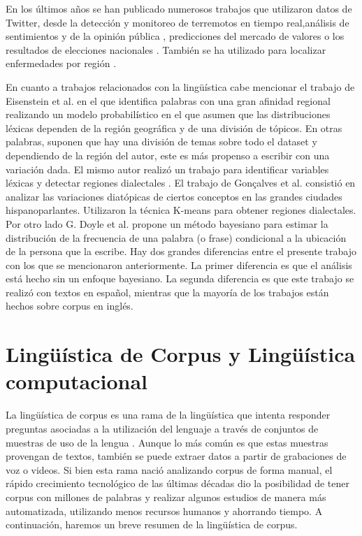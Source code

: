 En los últimos años se han publicado numerosos trabajos que utilizaron datos de Twitter, desde la detección y monitoreo de terremotos en tiempo real\cite{sakaki2010earthquake},análisis de sentimientos y de la opinión pública \cite{liu2012sentiment},  predicciones del mercado de valores \cite{pak2010twitter} o los resultados de elecciones nacionales \cite{tumasjan2010predicting}. También se ha utilizado para localizar enfermedades por región \cite{paul2011you}.

En cuanto a trabajos relacionados con la lingüística cabe mencionar el trabajo de Eisenstein et al. \cite{eisenstein2010latent} en el que identifica palabras con una gran afinidad regional realizando un modelo probabilístico en el que asumen que las distribuciones léxicas dependen de la región geográfica y de una división de tópicos. En otras palabras, suponen que hay una división de temas sobre todo el dataset y dependiendo de la región del autor, este es más propenso a escribir con una variación dada. El mismo autor realizó un trabajo para identificar variables léxicas y detectar regiones dialectales \cite{eisenstein2014identifying}.
El trabajo de Gonçalves et al. \cite{gonccalves2014crowdsourcing} consistió en analizar las variaciones diatópicas de ciertos conceptos en las grandes ciudades hispanoparlantes. Utilizaron la técnica K-means \cite{bishop2006pattern} para obtener regiones dialectales. Por otro lado G. Doyle et al. \cite{doyle2014mapping} propone un método bayesiano para estimar la distribución de la frecuencia de una palabra (o frase) condicional a la ubicación de la persona que la escribe.
Hay dos grandes diferencias entre el presente trabajo con los que se mencionaron anteriormente. La primer diferencia es que el análisis está hecho sin un enfoque bayesiano. La segunda diferencia es que este trabajo se realizó con textos en español, mientras que la mayoría de los trabajos están hechos sobre corpus en inglés. 


\section{Lingüística de Corpus y Lingüística computacional} %
\label{linguistica_computacional}

La lingüística de corpus es una rama de la lingüística que intenta responder 
preguntas asociadas a la utilización del lenguaje a través de conjuntos de muestras de uso de la lengua \cite{mcenery2011corpus}. Aunque lo más común es que estas muestras provengan de textos, también se puede extraer datos a partir de grabaciones de voz o videos. Si bien esta rama nació analizando corpus de forma manual, el rápido crecimiento
tecnológico de las últimas décadas dio la posibilidad de tener corpus con millones de palabras y realizar algunos estudios de manera más automatizada, utilizando menos recursos humanos y ahorrando tiempo. A continuación, haremos un breve resumen de la lingüística de corpus.

